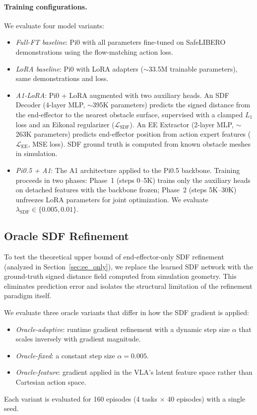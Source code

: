 \paragraph{Training configurations.} We evaluate four model variants:
\begin{itemize}
\item \textit{Full-FT baseline}: Pi0 with all parameters fine-tuned on SafeLIBERO demonstrations using the flow-matching action loss.
\item \textit{LoRA baseline}: Pi0 with LoRA adapters (${\sim}$33.5M trainable parameters), same demonstrations and loss.
\item \textit{A1-LoRA}: Pi0 + LoRA augmented with two auxiliary heads. An SDF Decoder (4-layer MLP, ${\sim}$395K parameters) predicts the signed distance from the end-effector to the nearest obstacle surface, supervised with a clamped $L_1$ loss and an Eikonal regularizer ($\mathcal{L}_\text{SDF}$). An EE Extractor (2-layer MLP, ${\sim}$263K parameters) predicts end-effector position from action expert features ($\mathcal{L}_\text{EE}$, MSE loss). SDF ground truth is computed from known obstacle meshes in simulation.
\item \textit{Pi0.5 + A1}: The A1 architecture applied to the Pi0.5 backbone. Training proceeds in two phases: Phase~1 (steps 0--5K) trains only the auxiliary heads on detached features with the backbone frozen; Phase~2 (steps 5K--30K) unfreezes LoRA parameters for joint optimization. We evaluate $\lambda_\text{SDF} \in \{0.005, 0.01\}$.
\end{itemize}

\subsection{Oracle SDF Refinement}\label{sec:oracle_setup}

To test the theoretical upper bound of end-effector-only SDF refinement (analyzed in Section~\ref{sec:ee_only}), we replace the learned SDF network with the ground-truth signed distance field computed from simulation geometry. This eliminates prediction error and isolates the structural limitation of the refinement paradigm itself.

We evaluate three oracle variants that differ in how the SDF gradient is applied:
\begin{itemize}
\item \textit{Oracle-adaptive}: runtime gradient refinement with a dynamic step size $\alpha$ that scales inversely with gradient magnitude.
\item \textit{Oracle-fixed}: a constant step size $\alpha = 0.005$.
\item \textit{Oracle-feature}: gradient applied in the VLA's latent feature space rather than Cartesian action space.
\end{itemize}
Each variant is evaluated for 160 episodes (4 tasks $\times$ 40 episodes) with a single seed.

